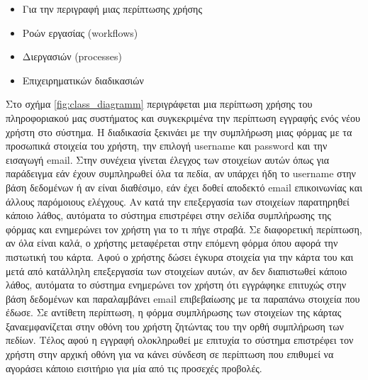 \documentclass{assignment}
\begin{document}
\begin{itemize}
\item Για την περιγραφή μιας περίπτωσης χρήσης
\item Ροών εργασίας (workflows)
\item Διεργασιών (processes)
\item Επιχειρηματικών διαδικασιών
\end{itemize}

Στο σχήμα \ref{fig:class_diagramm} περιγράφεται μια περίπτωση χρήσης του πληροφοριακού μας συστήματος και συγκεκριμένα την περίπτωση εγγραφής ενός νέου χρήστη στο σύστημα. Η διαδικασία ξεκινάει με την συμπλήρωση μιας φόρμας με τα προσωπικά στοιχεία του χρήστη, την επιλογή username και password και την εισαγωγή email. Στην συνέχεια γίνεται έλεγχος των στοιχείων αυτών όπως για παράδειγμα εάν έχουν συμπληρωθεί όλα τα πεδία, αν υπάρχει ήδη το username στην βάση δεδομένων ή αν είναι διαθέσιμο, εάν έχει δοθεί αποδεκτό email επικοινωνίας και άλλους παρόμοιους ελέγχους. Αν κατά την επεξεργασία των στοιχείων παρατηρηθεί κάποιο λάθος, αυτόματα το σύστημα επιστρέφει στην σελίδα συμπλήρωσης της φόρμας και ενημερώνει τον χρήστη για το τι πήγε στραβά. Σε διαφορετική περίπτωση, αν όλα είναι καλά, ο χρήστης μεταφέρεται στην επόμενη φόρμα όπου αφορά την πιστωτική του κάρτα. Αφού ο χρήστης δώσει έγκυρα στοιχεία για την κάρτα του και μετά από κατάλληλη επεξεργασία των στοιχείων αυτών, αν δεν διαπιστωθεί κάποιο λάθος, αυτόματα το σύστημα ενημερώνει τον χρήστη ότι εγγράφηκε επιτυχώς στην βάση δεδομένων και παραλαμβάνει email επιβεβαίωσης με τα παραπάνω στοιχεία που έδωσε. Σε αντίθετη περίπτωση, η φόρμα συμπλήρωσης των στοιχείων της κάρτας ξαναεμφανίζεται στην οθόνη του χρήστη ζητώντας του την ορθή συμπλήρωση των πεδίων. Τέλος αφού η εγγραφή ολοκληρωθεί με επιτυχία το σύστημα επιστρέφει τον χρήστη στην αρχική οθόνη για να κάνει σύνδεση σε περίπτωση που επιθυμεί να αγοράσει κάποιο εισιτήριο για μία από τις προσεχές προβολές.
\end{document}
